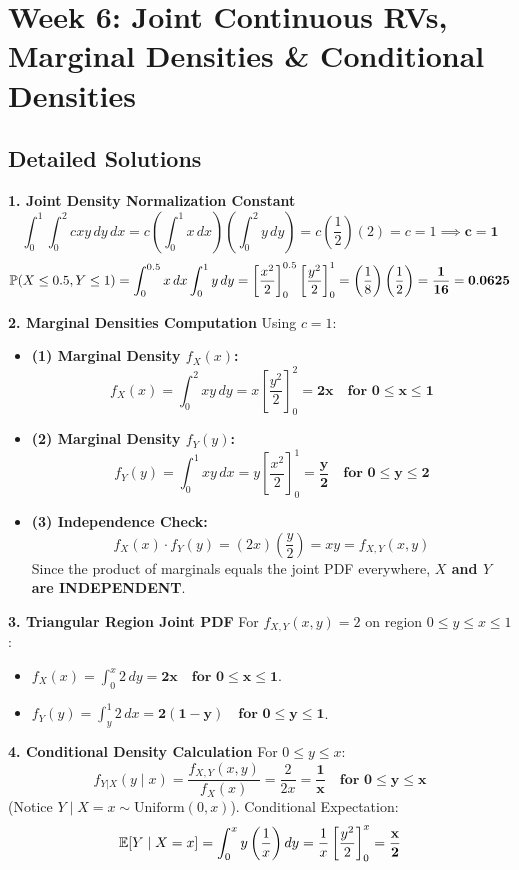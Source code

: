 \section*{Week 6: Joint Continuous RVs, Marginal Densities \& Conditional Densities}

\subsection*{Detailed Solutions}

\textbf{1. Joint Density Normalization Constant}
$$\int_0^1 \int_0^2 c x y \, dy \, dx = c \left(\int_0^1 x \, dx\right) \left(\int_0^2 y \, dy\right) = c \left( \frac{1}{2} \right) (2) = c = 1 \implies \mathbf{c = 1}$$
$$\P(X \le 0.5, Y \le 1) = \int_0^{0.5} x \, dx \int_0^1 y \, dy = \left[ \frac{x^2}{2} \right]_0^{0.5} \left[ \frac{y^2}{2} \right]_0^1 = \left( \frac{1}{8} \right) \left( \frac{1}{2} \right) = \mathbf{\frac{1}{16} = 0.0625}$$

\textbf{2. Marginal Densities Computation}
Using $c = 1$:
\begin{itemize}
    \item \textbf{(1) Marginal Density $f_X(x)$:}
    $$f_X(x) = \int_0^2 x y \, dy = x \left[ \frac{y^2}{2} \right]_0^2 = \mathbf{2x \quad \text{for } 0 \le x \le 1}$$
    \item \textbf{(2) Marginal Density $f_Y(y)$:}
    $$f_Y(y) = \int_0^1 x y \, dx = y \left[ \frac{x^2}{2} \right]_0^1 = \mathbf{\frac{y}{2} \quad \text{for } 0 \le y \le 2}$$
    \item \textbf{(3) Independence Check:}
    $$f_X(x) \cdot f_Y(y) = (2x) \left(\frac{y}{2}\right) = xy = f_{X,Y}(x, y)$$
    Since the product of marginals equals the joint PDF everywhere, \textbf{$X$ and $Y$ are INDEPENDENT}.
\end{itemize}

\textbf{3. Triangular Region Joint PDF}
For $f_{X,Y}(x, y) = 2$ on region $0 \le y \le x \le 1$:
\begin{itemize}
    \item $f_X(x) = \int_0^x 2 \, dy = \mathbf{2x \quad \text{for } 0 \le x \le 1}$.
    \item $f_Y(y) = \int_y^1 2 \, dx = \mathbf{2(1 - y) \quad \text{for } 0 \le y \le 1}$.

\end{itemize}
\textbf{4. Conditional Density Calculation}
For $0 \le y \le x$:
$$f_{Y|X}(y \mid x) = \frac{f_{X,Y}(x, y)}{f_X(x)} = \frac{2}{2x} = \mathbf{\frac{1}{x} \quad \text{for } 0 \le y \le x}$$
(Notice $Y \mid X=x \sim \text{Uniform}(0, x)$).
Conditional Expectation:
$$\E[Y \mid X = x] = \int_0^x y \left(\frac{1}{x}\right) dy = \frac{1}{x} \left[ \frac{y^2}{2} \right]_0^x = \mathbf{\frac{x}{2}}$$

